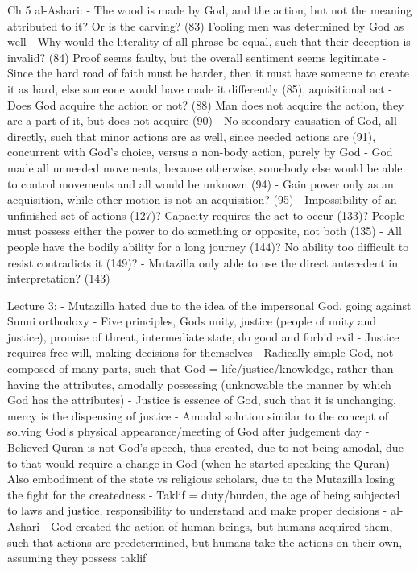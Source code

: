 \documentclass[11 pt, twoside]{article}
\begin{document}
Ch 5 al-Ashari:
- The wood is made by God, and the action, but not the meaning attributed to it? Or is the carving? (83) Fooling men was determined by God as well
	- Why would the literality of all phrase be equal, such that their deception is invalid? (84) Proof seems faulty, but the overall sentiment seems legitimate
- Since the hard road of faith must be harder, then it must have someone to create it as hard, else someone would have made it differently (85), aquisitional act
- Does God acquire the action or not? (88) Man does not acquire the action, they are a part of it, but does not acquire (90)
- No secondary causation of God, all directly, such that minor actions are as well, since needed actions are (91), concurrent with God's choice, versus a non-body action, purely by God
- God made all unneeded movements, because otherwise, somebody else would be able to control movements and all would be unknown (94)
	- Gain power only as an acquisition, while other motion is not an acquisition? (95)
- Impossibility of an unfinished set of actions (127)? Capacity requires the act to occur (133)? People must possess either the power to do something or opposite, not both (135)
	- All people have the bodily ability for a long journey (144)? No ability too difficult to resist contradicts it (149)?
- Mutazilla only able to use the direct antecedent in interpretation? (143)

Lecture 3:
- Mutazilla hated due to the idea of the impersonal God, going against Sunni orthodoxy
	- Five principles, Gods unity, justice (people of unity and justice), promise of threat, intermediate state, do good and forbid evil 
		- Justice requires free will, making decisions for themselves
	- Radically simple God, not composed of many parts, such that God = life/justice/knowledge, rather than having the attributes, amodally possessing (unknowable the manner by which God has the attributes)
		- Justice is essence of God, such that it is unchanging, mercy is the dispensing of justice
		- Amodal solution similar to the concept of solving God's physical appearance/meeting of God after judgement day
	- Believed Quran is not God's speech, thus created, due to not being amodal, due to that would require a change in God (when he started speaking the Quran)
	- Also embodiment of the state vs religious scholars, due to the Mutazilla losing the fight for the createdness
- Taklif = duty/burden, the age of being subjected to laws and justice, responsibility to understand and make proper decisions
- al-Ashari - God created the action of human beings, but humans acquired them, such that actions are predetermined, but humans take the actions on their own, assuming they possess taklif
\end{document}
